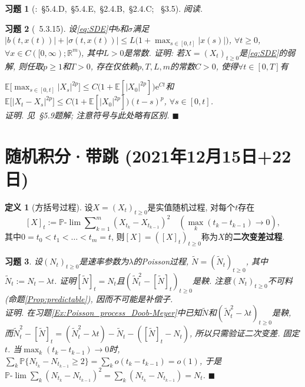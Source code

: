 \documentclass{ctexart}
\theoremstyle{definition}
\newtheorem{Def}{定义}[section]
\theoremstyle{remark}
\theoremstyle{plain}
\newtheorem{Ex}{习题}[section]
\newenvironment{Prf}{\vspace{1ex}\textbf{\\}{\color{red}\textit{证明}}.\normalfont}{\color{red}\hfill$\blacksquare$\vspace{1ex}\par}
\newcommand{\1}{\mathbbm{1}}				%
\renewcommand{\P}{\mathbb{P}}				%
\newcommand{\E}{\mathbb{E}}					%
\newcommand{\abs}[1]{\lvert#1\rvert}			%
\newcommand{\R}{\mathbb{R}}					%
\newcommand{\tsum}{\textstyle\sum\nolimits}
\newcommand{\e}{\mathrm{e}}
\begin{document}
\begin{Ex}[\cite{Karatzas-Shreve--GTM113}:~\S5.4.D,~\S5.4.E,~\S2.4.B,~\S2.4.C; \cite{龚光鲁-钱敏平}~\S3.5]
阅读.
\end{Ex}


\begin{Ex}[\cite{Karatzas-Shreve--GTM113}~5.3.15]
设\eqref{eq:SDE}中$b$和$\sigma$满足$\abs{b(t,x(t))}+\abs{\sigma(t,x(t))} \le L \big( 1 + \max_{s \in [0,t]} \abs{x(s)} \big)$, $\forall t \ge 0$, $\forall x \in C([0,\infty);\R^{m})$, 其中$L > 0$是常数. 证明: 若$X = (X_{t})_{t \ge 0}$是\eqref{eq:SDE}的弱解, 则任取$p \ge 1$和$T > 0$, 存在仅依赖$p,T,L,m$的常数$C > 0$, 使得$\forall t \in [0,T]$有\par\hspace{-1.8em}$\E\big[\max_{s \in [0,t]} \abs{X_{s}}^{2p}\big] \le C \big( 1 + \E[\abs{X_{0}}^{2p}] \big) \e^{Ct}$和$\E\big[\abs{X_{t}-X_{s}}^{2p}\big] \le C \big( 1 + \E[\abs{X_{0}}^{2p}] \big) (t-s)^{p}$, $\forall s \in [0,t]$.
\begin{Prf}
见\cite{Karatzas-Shreve--GTM113}~\S5.9题解; 注意符号与此处略有区别.
\end{Prf}
\end{Ex}



\section{随机积分·带跳 \normalfont\footnotesize (2021年12月15日+22日)}
\begin{Def}[方括号过程]
设$X = (X_{t})_{t \ge 0}$是实值随机过程, 对每个$t$存在
\[ [X]_{t} := \P\text{-}\lim \tsum_{k=1}^{m} (X_{t_k}-X_{t_{k-1}})^{2} \quad (\max_{k}(t_{k}-t_{k-1}) \to 0) , \]
其中$0 = t_{0} < t_{1} < \dots < t_{m} = t$, 则$[X] = ([X]_{t})_{t \ge 0}$称为$X$的\textbf{二次变差过程}.
\end{Def}

\begin{Ex}\label{Ex:Poisson_process_quadratic_variation}
设$(N_{t})_{t \ge 0}$是速率参数为$\lambda$的Poisson过程, $\tilde{N} = (\tilde{N}_{t})_{t \ge 0}$, 其中$\tilde{N}_{t} := N_{t} - \lambda t$. 证明$[\tilde{N}]_{t} = N_{t}$且$(\tilde{N}_{t}^{2}-[\tilde{N}]_{t})_{t \ge 0}$是鞅. 注意$(N_{t})_{t \ge 0}$不可料(命题\ref{Prop:predictable}), 因而不可能是补偿子.
\begin{Prf}
在习题\ref{Ex:Poisson_process_Doob-Meyer}中已知$\tilde{N}$和$(\tilde{N}_{t}^{2} - \lambda t)_{t \ge 0}$是鞅, 而$\tilde{N}_{t}^{2}-[\tilde{N}]_{t} = (\tilde{N}_{t}^{2} - \lambda t) - \tilde{N}_{t} - ([\tilde{N}]_{t}-N_{t})$, 所以只需验证二次变差. 固定$t$. 当$\max_{k}(t_{k}-t_{k-1}) \to 0$时, $\sum_{k}\P\{ N_{t_k}-N_{t_{k-1}} \ge 2 \} = \sum_{k}o(t_{k}-t_{k-1}) = o(1)$, 于是$\P\text{-}\lim\sum_{k}(N_{t_k}-N_{t_{k-1}})^{2} = \sum_{k}(N_{t_k}-N_{t_{k-1}}) = N_{t}$.
\end{Prf}
\end{Ex}
\end{document}
